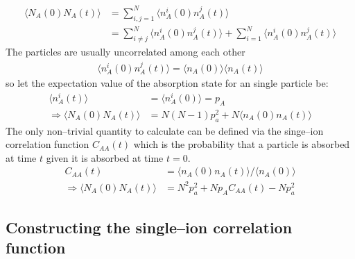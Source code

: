 \documentclass[a4paper, parskip=half]{scrartcl}
\begin{document}
\begin{align}
\langle N_A(0) N_A(t)\rangle &= \sum_{i,j = 1}^N \langle n_A^i(0) n_A^j(t)\rangle\\
&= \sum_{i \neq j}^N \langle n_A^i(0) n_A^j(t)\rangle + \sum_{i =1}^N \langle n_A^i(0) n_A^j(t)\rangle
\end{align}
The particles are usually uncorrelated among each other 
\begin{align}
\langle n_A^i(0) n_A^j(t)\rangle = \langle n_A(0) \rangle\langle n_A(t) \rangle
\end{align}
so let the expectation value of the absorption state for an single particle be:
\begin{align}
\langle n_A^i(t) \rangle &= \langle n_A^i(0) \rangle = p_A \\
\Rightarrow \langle N_A(0) N_A(t)\rangle &= N(N-1)p_a^2 + N\langle n_A(0) n_A(t)\rangle
\end{align}
The only non--trivial quantity to calculate can be defined via the singe--ion correlation function $C_{AA}(t)$ which is the probability that a particle is absorbed at time $t$ given it is absorbed at time $t=0$.
\begin{align}
C_{AA}(t) &= \langle n_A(0) n_A(t) \rangle / \langle n_A(0) \rangle \\
\Rightarrow \langle N_A(0) N_A(t)\rangle &= N^2p_a^2 + Np_AC_{AA}(t) - Np_a^2
\end{align}

\subsection{Constructing the single--ion correlation function}
\end{document}

